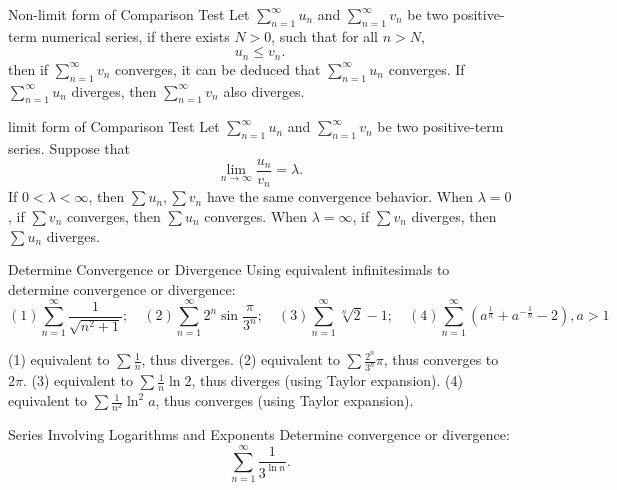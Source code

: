 \begin{theorem}{Non-limit form of Comparison Test}{}
  Let $\sum\limits_{n = 1}^{\infty} u_n$ and $\sum\limits_{n = 1}^{\infty}v_n$
  be two positive-term numerical series,
  if there exists $N > 0$, such that for all $n > N$,
  \begin{equation}
    u_n \leq v_n.
  \end{equation}
  then if $\sum\limits_{n = 1}^{\infty} v_n$ converges,
  it can be deduced that $\sum\limits_{n = 1}^{\infty}u_n$ converges.
  If $\sum\limits_{n = 1}^{\infty}u_n$ diverges,
  then $\sum\limits_{n = 1}^{\infty}v_n$ also diverges.
\end{theorem}

\begin{theorem}{limit form of Comparison Test}{}
  Let $\sum\limits_{n = 1}^{\infty} u_n$ and $\sum\limits_{n = 1}^{\infty}v_n$
  be two positive-term series.
  Suppose that
  \begin{equation}
    \lim \limits _{n \rightarrow \infty} \frac{u_n}{v_n} = \lambda.
  \end{equation}
  If $0 < \lambda < \infty$,
  then $\sum u_n, \sum v_n$ have the same convergence behavior.
  When $\lambda = 0$, if $\sum v_n$ converges,
  then $\sum u_n$ converges.
  When $\lambda = \infty$, if $\sum v_n$ diverges,
  then $\sum u_n$ diverges.
\end{theorem}

\begin{example}{Determine Convergence or Divergence}{}
  Using equivalent infinitesimals to determine convergence or divergence:
  \begin{equation}
    (1) \sum\limits_{n = 1}^{\infty} \frac{1}{\sqrt{n^2 + 1}}; \quad
    (2) \sum\limits_{n = 1}^{\infty} 2^n \sin \frac{\pi}{3^n}; \quad
    (3) \sum\limits_{n = 1}^{\infty} \sqrt[n]{2} - 1; \quad
    (4) \sum\limits_{n = 1}^{\infty} (a^{\frac{1}{n}} + a^{- \frac{1}{n}} - 2), a > 1
  \end{equation}
\end{example}

\begin{solution}
  (1) equivalent to $\sum \frac{1}{n}$, thus diverges.
  (2) equivalent to $\sum \frac{2^n}{3^n}\pi$, thus converges to $2\pi$.
  (3) equivalent to $\sum \frac{1}{n} \ln 2$, thus diverges (using Taylor expansion).
  (4) equivalent to $\sum \frac{1}{n^2} \ln^2 a$, thus converges (using Taylor expansion).
\end{solution}

\begin{example}{Series Involving Logarithms and Exponents}{}
  Determine convergence or divergence:
  \begin{equation}
    \sum\limits_{n = 1}^{\infty} \frac{1}{3^{\ln n}}.
  \end{equation}
\end{example}

